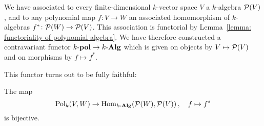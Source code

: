 \begin{fluff}
  We have associated to every finite-dimensional $k$-vector space $V$ a $k$-algebra $\mathcal{P}(V)$, and to any polynomial map $f \colon V \to W$ an associated homomorphism of $k$-algebras $f^* \colon \mathcal{P}(W) \to \mathcal{P}(V)$.
  This association is functorial by Lemma~\ref{lemma: functoriality of polynomial algebra}.
  We have therefore constructed a contravariant functor $k\text{-}\mathbf{pol} \to k\text{-}\mathbf{Alg}$ which is given on objects by $V \mapsto \mathcal{P}(V)$ and on morphisms by $f \mapsto f^*$.
  
  This functor turns out to be fully faithful:
\end{fluff}


\begin{proposition}
  The map
  \[
            \operatorname{Pol}_k(V,W)
    \to     \operatorname{Hom}_{k\text{-}\mathbf{Alg}}(\mathcal{P}(W), \mathcal{P}(V)) \,,
    \quad   f
    \mapsto f^*
  \]
  is bijective.
\end{proposition}
